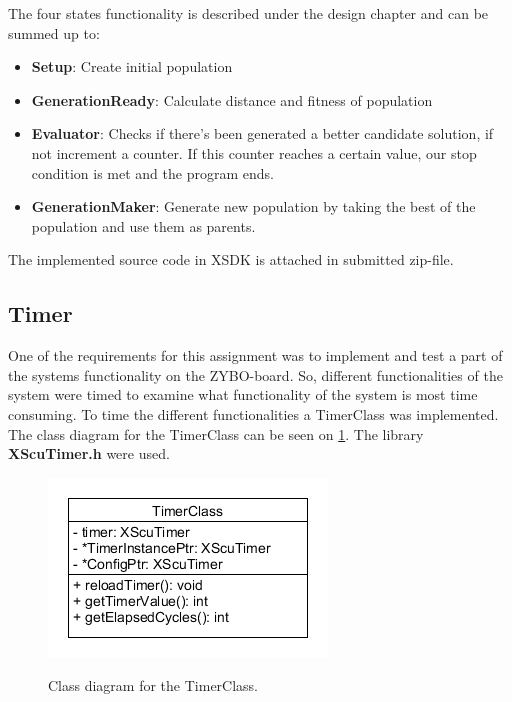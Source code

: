 The four states functionality is described under the design chapter and can be summed up to:

\begin{itemize}
	\item \textbf{Setup}: Create initial population
	\item \textbf{GenerationReady}: Calculate distance and fitness of population
	\item \textbf{Evaluator}: Checks if there's been generated a better candidate solution, if not increment a counter. If this counter reaches a certain value, our stop condition is met and the program ends.
	\item \textbf{GenerationMaker}: Generate new population by taking the best of the population and use them as parents.
\end{itemize}

The implemented source code in XSDK is attached in submitted zip-file.

\subsection{Timer}
One of the requirements for this assignment was to implement and test a part of the systems functionality on the ZYBO-board. So, different functionalities of the system were timed to examine what functionality of the system is most time consuming. To time the different functionalities a TimerClass was implemented. The class diagram for the TimerClass can be seen on \cref{fig:TimerClass_CD}. The library \textbf{XScuTimer.h} were used. 
\begin{figure}[H]
	\centering
	{\includegraphics[width=\textwidth/2]{Images/TimerClass_CD.PNG}}\\[0.5cm]
	\caption{Class diagram for the TimerClass.}
	\label{fig:TimerClass_CD}
\end{figure}

